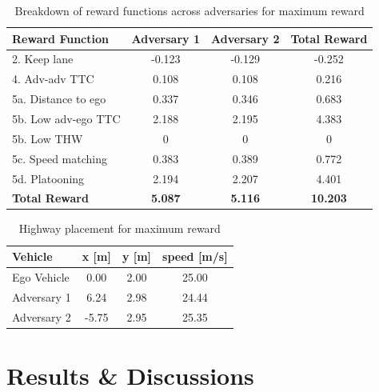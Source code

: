 \documentclass[12pt, a4paper]{report}
\begin{document}
\begin{table}[htbp]
    \centering
    \caption{Breakdown of reward functions across adversaries for maximum reward}
    \label{tab:reward_breakdown}
    \renewcommand{\arraystretch}{1.2} %
    \begin{tabular}{lccc}
        \toprule
        \textbf{Reward Function} & \textbf{Adversary 1} & \textbf{Adversary 2} & \textbf{Total Reward} \\
        \midrule
        2. Keep lane         & -0.123 & -0.129 & -0.252 \\
        4. Adv-adv TTC       &  0.108 &  0.108 &  0.216 \\
        5a. Distance to ego  &  0.337 &  0.346 &  0.683 \\
        5b. Low adv-ego TTC  &  2.188 &  2.195 &  4.383 \\
        5b. Low THW          &  0     &  0     &  0     \\
        5c. Speed matching   &  0.383 &  0.389 &  0.772 \\
        5d. Platooning       &  2.194 &  2.207 &  4.401 \\
        \midrule
        \textbf{Total Reward} & \textbf{5.087} & \textbf{5.116} & \textbf{10.203} \\
        \bottomrule
    \end{tabular}
\end{table}

\begin{table}[htbp]
    \centering
    \caption{Highway placement for maximum reward}
    \label{tab:vehicle_telemetry}
    \renewcommand{\arraystretch}{1.2} %
    \begin{tabular}{l c c c}
        \toprule
        \textbf{Vehicle} & \textbf{x} [m] & \textbf{y} [m] & \textbf{speed} [m/s] \\
        \midrule
        Ego Vehicle &  0.00 & 2.00 & 25.00 \\
        Adversary 1 &  6.24 & 2.98 & 24.44 \\
        Adversary 2 & -5.75 & 2.95 & 25.35 \\
        \bottomrule
    \end{tabular}
\end{table}

\section{Results & Discussions}
\end{document}
